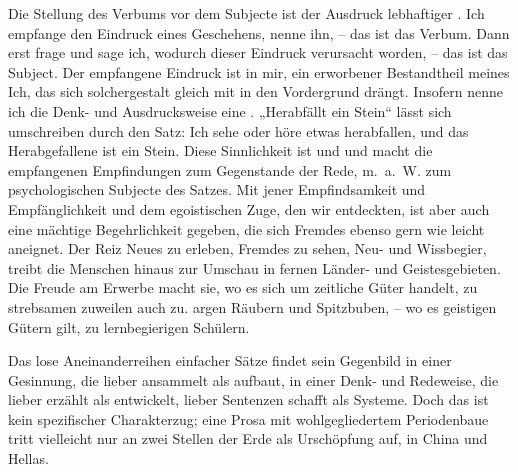 Die Stellung des Verbums vor dem Subjecte ist der Ausdruck lebhaftiger . Ich empfange den Eindruck eines Geschehens, nenne ihn, – das ist das Verbum. Dann erst frage und sage ich, wodurch dieser Eindruck verursacht worden, – das ist das Subject. Der empfangene Eindruck ist in mir, ein erworbener Bestandtheil meines Ich, das sich solchergestalt gleich mit in den Vordergrund drängt. Insofern nenne ich die Denk- und Ausdrucksweise eine . „Herabfällt ein Stein“ lässt sich umschreiben durch den Satz: Ich sehe oder höre etwas herabfallen, und das Herabgefallene ist ein Stein. Diese Sinnlichkeit ist  und  und macht die em\label{sp.414}pfangenen Empfindungen zum Gegenstande der Rede, m.~a.~W. zum psychologischen Subjecte des Satzes. Mit jener Empfindsamkeit und Empfänglichkeit und dem egoistischen Zuge, den wir entdeckten, ist aber auch eine mächtige Begehrlichkeit gegeben, die sich Fremdes ebenso gern wie leicht aneignet. Der Reiz Neues zu erleben, Fremdes zu sehen, Neu- und Wissbegier, treibt die Menschen hinaus zur Umschau in fernen Länder- und Geistesgebieten. Die Freude am Erwerbe macht sie, wo es sich um zeitliche Güter handelt, zu strebsamen  zuweilen auch zu. argen Räubern und Spitzbuben, – wo es geistigen Gütern gilt, zu lernbegierigen Schülern.

Das lose Aneinanderreihen einfacher Sätze findet sein Gegenbild in einer Gesinnung, die lieber ansammelt als aufbaut, in einer Denk- und Redeweise, die lieber erzählt als entwickelt, lieber Sentenzen schafft als Systeme. Doch das ist kein spezifischer Charakterzug; eine Prosa mit wohlgegliedertem Periodenbaue tritt vielleicht nur an zwei Stellen der Erde als Urschöpfung auf, in China und Hellas.

